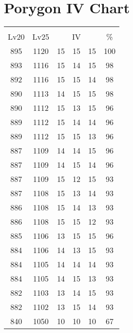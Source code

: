 \documentclass{article}%
\begin{document}
%
\normalsize%
\section{Porygon IV Chart}%
\label{sec:Porygon IV Chart}%
\renewcommand{\arraystretch}{1.5}%
\begin{tabular}{|c|c|c|c|c|c|}%
\hline%
\multicolumn{6}{|c|}{\textcolor{white}{ 
\linebreak{Porygon}
}%
\cellcolor{black}}\\%
\multicolumn{1}{|c}{Lv20}&\multicolumn{1}{c|}{Lv25}&\multicolumn{3}{c|}{IV}&\multicolumn{1}{|c|}{\%}\\%
\hline%
\rowcolor{color100}%
895&1120&15&15&15&100\\%
\hline%
\rowcolor{color98}%
893&1116&15&14&15&98\\%
\hline%
\rowcolor{color98}%
892&1116&15&15&14&98\\%
\hline%
\rowcolor{color98}%
890&1113&14&15&15&98\\%
\hline%
\rowcolor{color96}%
890&1112&15&13&15&96\\%
\hline%
\rowcolor{color96}%
889&1112&15&14&14&96\\%
\hline%
\rowcolor{color96}%
889&1112&15&15&13&96\\%
\hline%
\rowcolor{color96}%
887&1109&14&14&15&96\\%
\hline%
\rowcolor{color96}%
887&1109&14&15&14&96\\%
\hline%
\rowcolor{color93}%
887&1109&15&12&15&93\\%
\hline%
\rowcolor{color93}%
887&1108&15&13&14&93\\%
\hline%
\rowcolor{color93}%
886&1108&15&14&13&93\\%
\hline%
\rowcolor{color93}%
886&1108&15&15&12&93\\%
\hline%
\rowcolor{color96}%
885&1106&13&15&15&96\\%
\hline%
\rowcolor{color93}%
884&1106&14&13&15&93\\%
\hline%
\rowcolor{color93}%
884&1105&14&14&14&93\\%
\hline%
\rowcolor{color93}%
884&1105&14&15&13&93\\%
\hline%
\rowcolor{color93}%
882&1103&13&14&15&93\\%
\hline%
\rowcolor{color93}%
882&1102&13&15&14&93\\%
\hline%
\rowcolor{color91}%
840&1050&10&10&10&67\\%
\end{tabular}

%
\end{document}
